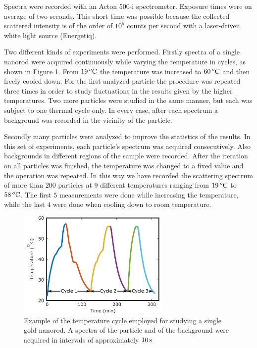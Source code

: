 Spectra were recorded with an Acton $500\textrm{-i}$ spectrometer. Exposure
times were on average of two seconds. This short time was possible because the
collected scattered intensity is of the order of $10^5$ counts per second with a
laser-driven white light source (Energetiq).

Two different kinds of experiments were performed. Firstly spectra of a single
nanorod were acquired continuously while varying the temperature in cycles, as
shown in Figure \ref{fig:temp-cycle}. From $19\,^o\textrm{C}$ the temperature was
increased to $60\,^o\textrm{C}$ and then freely cooled down. For the first analyzed
particle the procedure was repeated three times in order to study fluctuations
in the results given by the higher temperatures. Two more particles were studied
in the same manner, but each was subject to one thermal cycle only. In every
case, after each spectrum a background was recorded in the vicinity of the particle.
 
Secondly many particles were analyzed to improve the statistics of the results.
In this set of experiments, each particle's spectrum was acquired consecutively.
Also backgrounds in different regions of the sample were recorded. After the
iteration on all particles was finished, the temperature was changed to a fixed
value and the operation was repeated. In this way we have recorded the
scattering spectrum of more than $200$ particles at $9$ different temperatures
ranging from $19\,^o\textrm{C}$ to $58\,^o\textrm{C}$. The first $5$ measurements were done
while increasing the temperature, while the last $4$ were done when cooling down
to room temperature.

\begin{figure}[tp] \centering
\includegraphics[width=74.2mm]{Chapters/05_WhiteLight/Figures/Supplementary/01_Temp_Cycle/01_Temp_Cycle.png}
\caption{Example of the temperature cycle employed for studying a single gold
nanorod. A spectra of the particle and of the background were acquired in
intervals of approximately $10\,\textrm{s}$}
	\label{fig:temp-cycle}
\end{figure}

